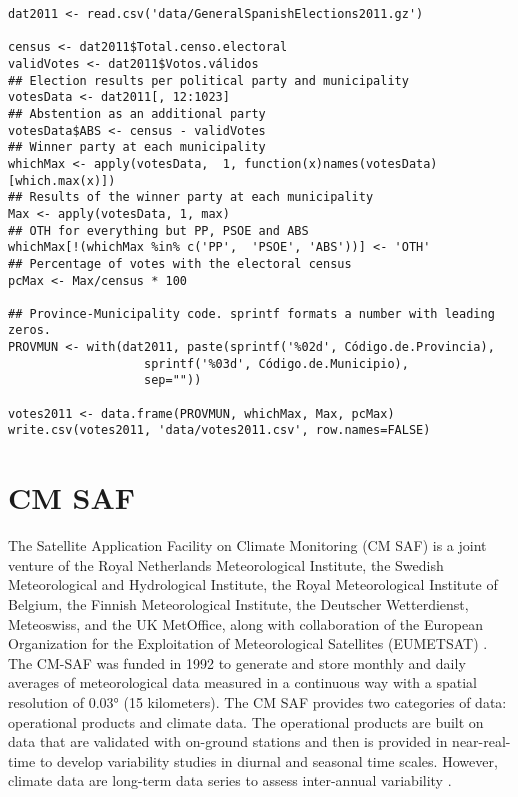 
\lstset{language=R,numbers=none}
\begin{lstlisting}
dat2011 <- read.csv('data/GeneralSpanishElections2011.gz')

census <- dat2011$Total.censo.electoral
validVotes <- dat2011$Votos.válidos
## Election results per political party and municipality
votesData <- dat2011[, 12:1023]
## Abstention as an additional party
votesData$ABS <- census - validVotes
## Winner party at each municipality
whichMax <- apply(votesData,  1, function(x)names(votesData)[which.max(x)])
## Results of the winner party at each municipality
Max <- apply(votesData, 1, max)
## OTH for everything but PP, PSOE and ABS
whichMax[!(whichMax %in% c('PP',  'PSOE', 'ABS'))] <- 'OTH'
## Percentage of votes with the electoral census
pcMax <- Max/census * 100

## Province-Municipality code. sprintf formats a number with leading zeros.
PROVMUN <- with(dat2011, paste(sprintf('%02d', Código.de.Provincia),
			       sprintf('%03d', Código.de.Municipio),
			       sep=""))

votes2011 <- data.frame(PROVMUN, whichMax, Max, pcMax)
write.csv(votes2011, 'data/votes2011.csv', row.names=FALSE)
\end{lstlisting}

\section{CM SAF}
\label{sec-3}
\label{sec:CMSAF}

The Satellite Application Facility on Climate Monitoring (CM SAF) is a
joint venture of the Royal Netherlands Meteorological Institute, the
Swedish Meteorological and Hydrological Institute, the Royal
Meteorological Institute of Belgium, the Finnish Meteorological
Institute, the Deutscher Wetterdienst, Meteoswiss, and the UK
MetOffice, along with collaboration of the European Organization for
the Exploitation of Meteorological Satellites (EUMETSAT)
\cite{CMSAF}. The CM-SAF was funded in 1992 to generate and store
monthly and daily averages of meteorological data measured in a
continuous way with a spatial resolution of $\ang{0.03}$ (15
kilometers). The CM SAF provides two categories of data: operational
products and climate data. The operational products are built on data
that are validated with on-ground stations and then is provided in
near-real-time to develop variability studies in diurnal and seasonal
time scales. However, climate data are long-term data series to assess
inter-annual variability \cite{Posselt.Mueller.ea2012}.

